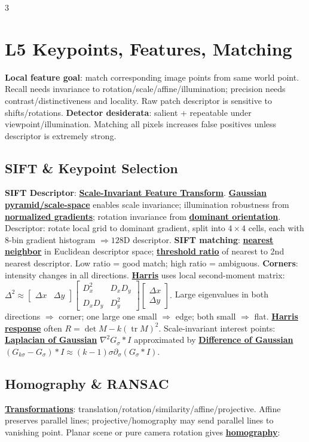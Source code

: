 \documentclass{article}
\numberwithin{equation}{subsection}
\newcommand{\key}[1]{\textbf{#1}}
\newcommand{\lowterm}[1]{\textbf{\underline{#1}}}
\begin{document}
\begin{multicols*}{3}
\section{L5 Keypoints, Features, Matching}
\key{Local feature goal}: match corresponding image points from same world point. Recall needs invariance to rotation/scale/affine/illumination; precision needs contrast/distinctiveness and locality. Raw patch descriptor is sensitive to shifts/rotations.
\key{Detector desiderata}: salient + repeatable under viewpoint/illumination. Matching all pixels increases false positives unless descriptor is extremely strong.
\subsection{SIFT \& Keypoint Selection}
\key{SIFT Descriptor}: \lowterm{Scale-Invariant Feature Transform}. \lowterm{Gaussian pyramid/scale-space} enables scale invariance; illumination robustness from \lowterm{normalized gradients}; rotation invariance from \lowterm{dominant orientation}. Descriptor: rotate local grid to dominant gradient, split into $4\times4$ cells, each with 8-bin gradient histogram $\Rightarrow128$D descriptor.
\key{SIFT matching}: \lowterm{nearest neighbor} in Euclidean descriptor space; \lowterm{threshold ratio} of nearest to 2nd nearest descriptor. Low ratio = good match; high ratio = ambiguous.
\key{Corners}: intensity changes in all directions. \lowterm{Harris} uses local second-moment matrix:
\(
\Delta^2\approx
\begin{bmatrix}\Delta x&\Delta y\end{bmatrix}
\begin{bmatrix}D_x^2&D_xD_y\\D_xD_y&D_y^2\end{bmatrix}
\begin{bmatrix}\Delta x\\\Delta y\end{bmatrix}.
\)
Large eigenvalues in both directions $\Rightarrow$ corner; one large one small $\Rightarrow$ edge; both small $\Rightarrow$ flat. \lowterm{Harris response} often $R=\det M-k(\operatorname{tr}M)^2$. Scale-invariant interest points: \lowterm{Laplacian of Gaussian} $\nabla^2G_\sigma*I$ approximated by \lowterm{Difference of Gaussian} $(G_{k\sigma}-G_\sigma)*I\approx (k-1)\sigma\partial_\sigma(G_\sigma*I)$.

\subsection{Homography \& RANSAC}
\lowterm{Transformations}: translation/rotation/similarity/affine/projective. Affine preserves parallel lines; projective/homography may send parallel lines to vanishing point. Planar scene or pure camera rotation gives \lowterm{homography}:


\end{multicols*}
\end{document}
